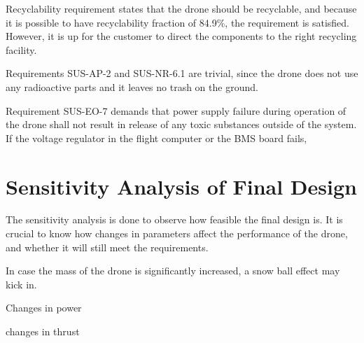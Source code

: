 Recyclability requirement states that the drone should be recyclable, and because it is possible to have recyclability fraction of 84.9\%, the requirement is satisfied. However, it is up for the customer to direct the components to the right recycling facility. 

Requirements SUS-AP-2 and SUS-NR-6.1 are trivial, since the drone does not use any radioactive parts and it leaves no trash on the ground. 

Requirement SUS-EO-7 demands that power supply failure during operation of the drone shall not result in release of any toxic substances outside of the system. If the voltage regulator in the flight computer or the BMS board fails, 




\section{Sensitivity Analysis of Final Design}

The sensitivity analysis is done to observe how feasible the final design is. It is crucial to know how changes in parameters affect the performance of the drone, and whether it will still meet the requirements.

In case the mass of the drone is significantly increased, a snow ball effect may kick in. 

Changes in power

changes in thrust